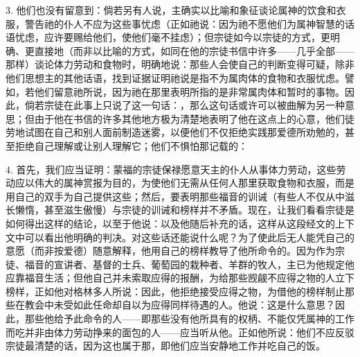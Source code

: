 3. 他们也没有留意到：倘若另有人说，主确实以比喻和象征谈论属神的饮食和衣服，警告祂的仆人不应为这些事忧虑（正如祂说：因为祂不愿他们为属神智慧的话语忧虑，应许要赐给他们，使他们毫不挂虑）；但宗徒如今以宗徒的方式，更明确、更直接地（而非以比喻的方式，如同在他的宗徒书信中许多——几乎全部——那样）谈论体力劳动和食物时，明确地说：那些人会使自己的判断变得可疑，除非他们思想主的其他话语，找到证据证明祂说是指不为属肉体的食物和衣服忧虑。譬如，若他们留意祂所说，因为祂在那里表明所指的是非常属肉体和暂时的事物。因此，倘若宗徒在此事上只说了这一句话：，那么这句话或许可以被曲解为另一种意思；但由于他在书信的许多其他地方极为清楚地表明了他在这点上的心意，他们徒劳地试图在自己和别人面前制造迷雾，以便他们不仅拒绝实践那爱德所劝勉的，甚至拒绝自己理解或让别人理解它；他们不惧怕那记载的：\par

4. 首先，我们应当证明：蒙福的宗徒保禄愿意天主的仆人从事体力劳动，这些劳动应以伟大的属神赏报为目的，为使他们无需从任何人那里获取食物和衣服，而是用自己的双手为自己提供这些；然后，要表明那些福音的训诫（有些人不仅从中滋长懒惰，甚至滋生傲慢）与宗徒的训诫和榜样并不矛盾。现在，让我们看看宗徒是如何得出这样的结论，以至于他说：以及他随后补充的话，这样从这段经文的上下文中可以看出他明确的判决。对这些话还能说什么呢？为了使此后无人能凭自己的意愿（而非按爱德）随意解释，他用自己的榜样教导了他所命令的。因为作为宗徒、福音的宣讲者、基督的士兵、葡萄园的栽种者、羊群的牧人，主已为他规定他应靠福音生活；但他自己并未索取应得的报酬，为给那些觊觎不应得之物的人立下榜样，正如他对格林多人所说：因此，他拒绝接受应得之物，为借他的榜样制止那些在教会中未受如此任命却自以为应得同样待遇的人。他说：这是什么意思？因此，那些他给予此命令的人——即那些没有他所具有的权柄、不能仅凭属神的工作而吃并非由体力劳动挣来的面包的人——应当听从他。正如他所说：他们不应反驳宗徒最清楚的话，因为这也属于那，即他们应当安静地工作并吃自己的饭。\par

